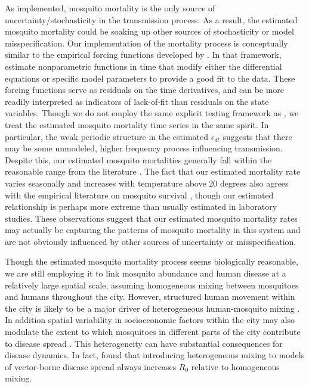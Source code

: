 \documentclass[10pt,letterpaper]{article}
\begin{document}
As implemented, mosquito mortality is the only source of uncertainty/stochasticity in the transmission process.
As a result, the estimated mosquito mortality could be soaking up other sources of stochasticity or model misspecification.
Our implementation of the mortality process is conceptually similar to the empirical forcing functions developed by \cite{Hooker2015}.
In that framework, \cite{Hooker2015} estimate nonparametric functions in time that modify either the differential equations or specific model parameters to provide a good fit to the data.
These forcing functions serve as residuals on the time derivatives, and can be more readily interpreted as indicators of lack-of-fit than residuals on the state variables.
Though we do not employ the same explicit testing framework as \cite{Hooker2015}, we treat the estimated mosquito mortality time series in the same spirit.
In particular, the weak periodic structure in the estimated $\epsilon_{dt}$ suggests that there may be some unmodeled, higher frequency process influencing transmission.
Despite this, our estimated mosquito mortalities generally fall within the reasonable range from the literature \cite{Maciel-de-Freitas2008, Brady2013}.
The fact that our estimated mortality rate varies seasonally and increases with temperature above 20 degrees also agrees with the empirical literature on mosquito survival \cite{Yang2009}, though our estimated relationship is perhaps more extreme than usually estimated in laboratory studies.
These observations suggest that our estimated mosquito mortality rates may actually be capturing the patterns of mosquito mortality in this system and are not obviously influenced by other sources of uncertainty or misspecification.

Though the estimated mosquito mortality process seems biologically reasonable, we are still employing it to link mosquito abundance and human disease at a relatively large spatial scale, assuming homogeneous mixing between mosquitoes and humans throughout the city.
However, structured human movement within the city is likely to be a major driver of heterogeneous human-mosquito mixing \cite{Adams2009, Cosner2009a, Stoddard2009}.
In addition spatial variability in socioeconomic factors within the city may also modulate the extent to which mosquitoes in different parts of the city contribute to disease spread \cite{Mondini2008, Honorio2009, Hu2012, DeMattosAlmeida2007}.
This heterogeneity can have substantial consequences for disease dynamics.
In fact, \cite{Dye1986, Hasibeder1988} found that introducing heterogeneous mixing to models of vector-borne disease spread always increases $R_0$ relative to homogeneous mixing.
\end{document}
